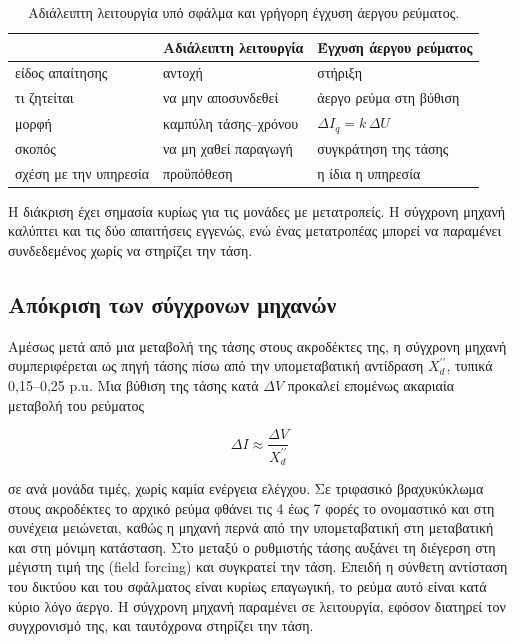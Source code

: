\begin{table}[!htbp]
\centering
\begin{tabular}{lll}
\hline
 & Αδιάλειπτη λειτουργία & Έγχυση άεργου ρεύματος \\
\hline
είδος απαίτησης & αντοχή & στήριξη \\
τι ζητείται & να μην αποσυνδεθεί & άεργο ρεύμα στη βύθιση \\
μορφή & καμπύλη τάσης--χρόνου & $\Delta I_q = k\,\Delta U$ \\
σκοπός & να μη χαθεί παραγωγή & συγκράτηση της τάσης \\
σχέση με την υπηρεσία & προϋπόθεση & η ίδια η υπηρεσία \\
\hline
\end{tabular}
\caption{Αδιάλειπτη λειτουργία υπό σφάλμα και γρήγορη έγχυση άεργου ρεύματος.}
\label{tab:frt-vs-q}
\end{table}

Η διάκριση έχει σημασία κυρίως για τις μονάδες με μετατροπείς. Η σύγχρονη μηχανή καλύπτει και
τις δύο απαιτήσεις εγγενώς, ενώ ένας μετατροπέας μπορεί να παραμένει συνδεδεμένος χωρίς να
στηρίζει την τάση.

\subsection{Απόκριση των σύγχρονων μηχανών}
\label{sec:sm-response}

Αμέσως μετά από μια μεταβολή της τάσης στους ακροδέκτες της, η σύγχρονη μηχανή συμπεριφέρεται
ως πηγή τάσης πίσω από την υπομεταβατική αντίδραση $X_d^{\prime\prime}$, τυπικά 0,15--0,25 p.u.
Μια βύθιση της τάσης κατά $\Delta V$ προκαλεί επομένως ακαριαία μεταβολή του ρεύματος

\begin{equation}
\Delta I \approx \frac{\Delta V}{X_d^{\prime\prime}}
\label{eq:sm-dI}
\end{equation}

σε ανά μονάδα τιμές, χωρίς καμία ενέργεια ελέγχου. Σε τριφασικό βραχυκύκλωμα στους ακροδέκτες
το αρχικό ρεύμα φθάνει τις 4 έως 7 φορές το ονομαστικό και στη συνέχεια μειώνεται, καθώς η
μηχανή περνά από την υπομεταβατική στη μεταβατική και στη μόνιμη κατάσταση. Στο μεταξύ ο
ρυθμιστής τάσης αυξάνει τη διέγερση στη μέγιστη τιμή της (field forcing) και συγκρατεί την
τάση. Επειδή η σύνθετη αντίσταση του δικτύου και του σφάλματος είναι κυρίως επαγωγική, το ρεύμα
αυτό είναι κατά κύριο λόγο άεργο. Η σύγχρονη μηχανή παραμένει σε λειτουργία, εφόσον διατηρεί
τον συγχρονισμό της, και ταυτόχρονα στηρίζει την τάση.

